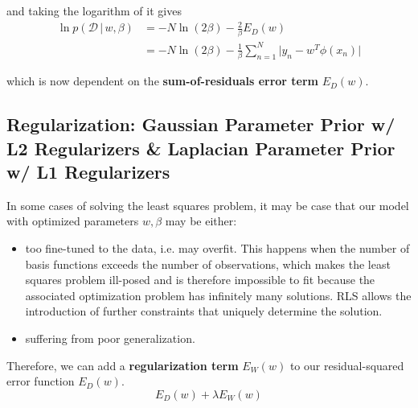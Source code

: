   and taking the logarithm of it gives
  \begin{align*}
    \ln p( \mathcal{D}\,|\, w, \beta) & = -N \ln{(2\beta)} - \frac{2}{\beta} E_D (w) \\
    & = -N \ln{(2\beta)} - \frac{1}{\beta} \sum_{n=1}^N \big| y_n - w^T \phi(x_n) \big|
  \end{align*}

  which is now dependent on the \textbf{sum-of-residuals error term} $E_D(w)$.

\subsection{Regularization: Gaussian Parameter Prior w/ L2 Regularizers \& Laplacian Parameter Prior w/ L1 Regularizers}

  In some cases of solving the least squares problem, it may be case that our model with optimized parameters $w, \beta$ may be either:
  \begin{itemize}
    \item too fine-tuned to the data, i.e. may overfit. This happens when the number of basis functions exceeds the number of observations, which makes the least squares problem ill-posed and is therefore impossible to fit because the associated optimization problem has infinitely many solutions. RLS allows the introduction of further constraints that uniquely determine the solution.
    \item suffering from poor generalization.
  \end{itemize}

  Therefore, we can add a \textbf{regularization term} $E_W (w)$ to our residual-squared error function $E_D (w)$.
  \begin{equation}
    E_D (w) + \lambda E_W (w)
  \end{equation}

